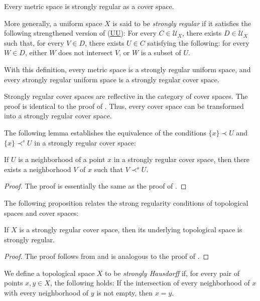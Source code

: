 \documentclass[reqno]{amsart}
\newcommand{\axref}[1]{(\hyperref[ax:#1]{#1})}
\theoremstyle{definition}
\theoremstyle{remark}
\numberwithin{figure}{section}
\newcommand{\rb}{\prec}
\begin{document}
\begin{example}
Every metric space is strongly regular as a cover space.
\end{example}

\begin{example}
More generally, a uniform space $X$ is said to be \emph{strongly regular} if it satisfies the following strengthened version of \axref{UU}:  
For every $C \in \mathcal{U}_X$, there exists $D \in \mathcal{U}_X$ such that, for every $V \in D$,
there exists $U \in C$ satisfying the following: for every $W \in D$, either $W$ does not intersect $V$, or $W$ is a subset of $U$.

With this definition, every metric space is a strongly regular uniform space, and every strongly regular uniform space is a strongly regular cover space.
\end{example}

\begin{example}
Strongly regular cover spaces are reflective in the category of cover spaces.
The proof is identical to the proof of .
Thus, every cover space can be transformed into a strongly regular cover space.
\end{example}

The following lemma establishes the equivalence of the conditions $\{ x \} \rb U$ and $\{ x \} \rb^s U$ in a strongly regular cover space:

\begin{lem}
If $U$ is a neighborhood of a point $x$ in a strongly regular cover space, then there exists a neighborhood $V$ of $x$ such that $V \rb^s U$.
\end{lem}
\begin{proof}
The proof is essentially the same as the proof of .
\end{proof}

The following proposition relates the strong regularity conditions of topological spaces and cover spaces:

\begin{prop}
If $X$ is a strongly regular cover space, then its underlying topological space is strongly regular.
\end{prop}
\begin{proof}
The proof follows from  and is analogous to the proof of .
\end{proof}

We define a topological space $X$ to be \emph{strongly Hausdorff} if, for every pair of points $x,y \in X$, the following holds:  
If the intersection of every neighborhood of $x$ with every neighborhood of $y$ is not empty, then $x = y$.
\end{document}
